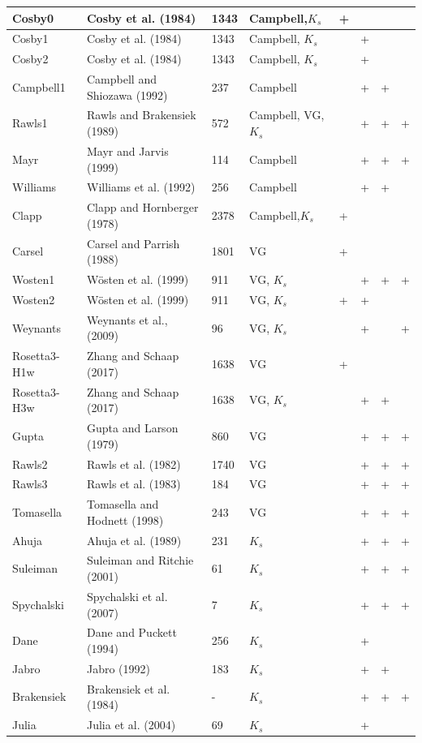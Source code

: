 \begin{landscape}
\begin{ThreePartTable}
\begin{center}
\begin{longtable}{p{2cm}<{\centering}p{4cm}<{\centering}p{2cm}<{\centering}p{2.8cm}<{\centering}p{2cm}<{\centering}p{2cm}<{\centering}p{2cm}<{\centering}p{2cm}<{\centering}}
Cosby0&	Cosby et al. (1984)&	1343&	Campbell,$K_s$&  + & & & \\ \midrule
Cosby1&	Cosby et al. (1984)&	1343&	Campbell, $K_s$&	&	+&	&	\\\midrule
Cosby2&	Cosby et al. (1984)&	1343&	Campbell, $K_s$&	&	+&	&	\\\midrule
Campbell1&	Campbell and Shiozawa (1992)&	237&	Campbell&	&	+&	+&	\\\midrule
Rawls1&	Rawls and Brakensiek (1989)&	572&	Campbell, VG, $K_s$&	&	+&	+&	+\\\midrule
Mayr&	Mayr and Jarvis (1999)&	114&	Campbell&	&	+&	+&	+\\\midrule
Williams&	Williams et al. (1992)&	256&	Campbell&	&	+&	+&	\\\midrule
Clapp&	Clapp and Hornberger (1978)&	2378&	Campbell,$K_s$&  +	& & & \\\midrule
Carsel&	Carsel and Parrish (1988)&	1801&	VG&	+&	&	&	\\\midrule
Wosten1&	Wösten et al. (1999)&	911&	VG, $K_s$&	&	+&	+&	+\\\midrule
Wosten2&	Wösten et al. (1999)&	911&	VG, $K_s$&	+&	+&	&	\\\midrule
Weynants&	Weynants et al., (2009)&	96&	VG, $K_s$&	&	+&	&	+\\\midrule
Rosetta3-H1w&	Zhang and Schaap (2017)&	1638&	VG&	+&	&	&	\\\midrule
Rosetta3-H3w&	Zhang and Schaap (2017)&	1638&	VG, $K_s$&	&	+&	+&	\\\midrule
Gupta&	Gupta and Larson (1979)&	860&	VG&	&	+&	+&	+\\\midrule
Rawls2&	Rawls et al. (1982)&	1740&	VG&	&	+&	+&	+\\\midrule
Rawls3&	Rawls et al. (1983)&	184&	VG&	&	+&	+&	+\\\midrule
Tomasella&	Tomasella and Hodnett (1998)&	243&	VG&	&	+&	+&	+\\\midrule
Ahuja&	Ahuja et al. (1989)&	231&	$K_s$&	&	+&	+&	+\\\midrule
Suleiman&	Suleiman and Ritchie (2001)&	61&	$K_s$&	&	+&	+&	+\\\midrule
Spychalski&	Spychalski et al. (2007)&	7&	$K_s$&	&	+&	+&	+\\\midrule
Dane&	Dane and Puckett (1994)&	256&	$K_s$&	&	+&	&	\\\midrule
Jabro&	Jabro (1992)&	183&	$K_s$&	&	+&	+&	\\\midrule
Brakensiek& 	Brakensiek et al. (1984)&	-&	$K_s$&	&	+&	+&	+\\\midrule
Julia&	Julia et al. (2004)&	69&	$K_s$&	&	+&	&	\\\midrule

\end{longtable}
\end{center}
\end{ThreePartTable}
\end{landscape}
